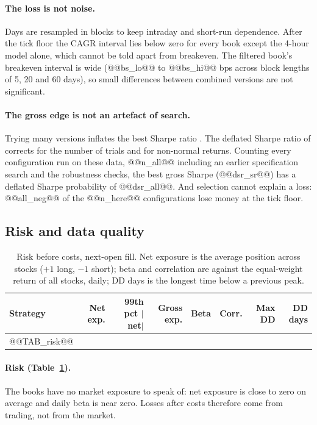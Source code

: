 \documentclass[11pt,a4paper]{article}
\begin{document}
\paragraph{The loss is not noise.} Days are resampled in blocks to keep intraday and short-run dependence.
After the tick floor the CAGR interval lies below zero for every book except the 4-hour model alone, which
cannot be told apart from breakeven. The filtered book's breakeven interval is wide (@@bs_lo@@ to @@bs_hi@@
bps across block lengths of 5, 20 and 60 days), so small differences between combined versions are not
significant.

\paragraph{The gross edge is not an artefact of search.} Trying many versions inflates the best Sharpe
ratio \citep{harvey2016}. The deflated Sharpe ratio of \citet{bailey2014} corrects for the number of
trials and for non-normal returns. Counting every configuration run on these data, @@n_all@@ including
an earlier specification search and the robustness checks, the best gross Sharpe (@@dsr_sr@@) has a
deflated Sharpe probability of @@dsr_all@@. And selection cannot explain a loss: @@all_neg@@ of the
@@n_here@@ configurations lose money at the tick floor.

\subsection{Risk and data quality}

\begin{table}[htbp]
\centering
\caption{Risk before costs, next-open fill. Net exposure is the average position across stocks ($+1$ long,
$-1$ short); beta and correlation are against the equal-weight return of all stocks, daily; DD days is
the longest time below a previous peak.}
\label{tab:risk}
\footnotesize
\setlength{\tabcolsep}{3pt}
\begin{tabular}{@{}lrrrrrrr@{}}
\toprule
Strategy & Net exp. & 99th pct $|$net$|$ & Gross exp. & Beta & Corr. & Max DD & DD days \\
\midrule
@@TAB_risk@@
\bottomrule
\end{tabular}
\end{table}

\paragraph{Risk (Table~\ref{tab:risk}).} The books have no market exposure to speak of: net exposure is
close to zero on average and daily beta is near zero. Losses after costs therefore come from trading, not
from the market.
\end{document}
